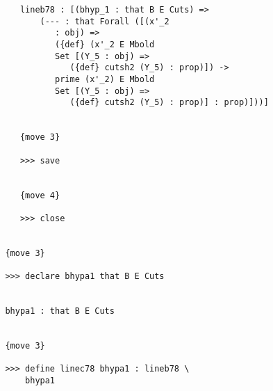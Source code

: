 \documentclass[12pt]{article}
\begin{document}
\begin{verbatim}
            lineb78 : [(bhyp_1 : that B E Cuts) => 
                (--- : that Forall ([(x'_2 
                   : obj) => 
                   ({def} (x'_2 E Mbold 
                   Set [(Y_5 : obj) => 
                      ({def} cutsh2 (Y_5) : prop)]) -> 
                   prime (x'_2) E Mbold 
                   Set [(Y_5 : obj) => 
                      ({def} cutsh2 (Y_5) : prop)] : prop)]))]


            {move 3}

            >>> save


            {move 4}

            >>> close


         {move 3}

         >>> declare bhypa1 that B E Cuts


         bhypa1 : that B E Cuts


         {move 3}

         >>> define linec78 bhypa1 : lineb78 \
             bhypa1



\end{verbatim}
\end{document}
